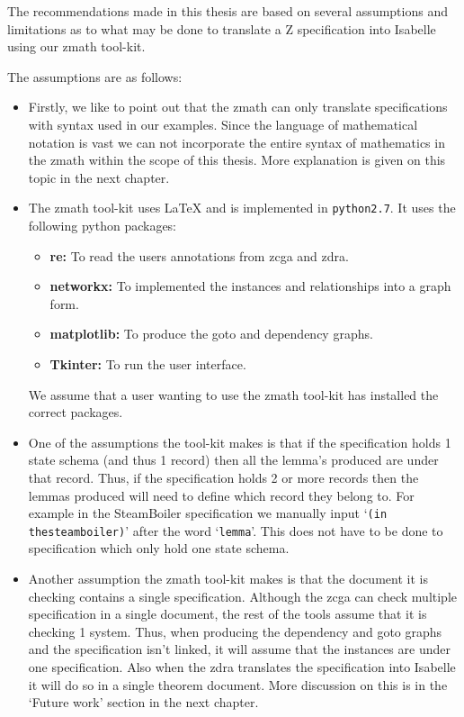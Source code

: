 The recommendations made in this thesis are based on several assumptions and
limitations as to what may be done to translate a Z specification into Isabelle
using our \gls{zmath} tool-kit.

The assumptions are as follows:

\begin{itemize}
\item Firstly, we like to point out that the \gls{zmath} can only translate
specifications with syntax used in our examples. Since the language of
mathematical notation is vast we can not incorporate the entire syntax of
mathematics in the \gls{zmath} within the scope of this thesis. More explanation
is given on this topic in the next chapter.

\item The \gls{zmath} tool-kit uses \LaTeX{} and is implemented in 
\verb|python2.7|. It uses the following python packages:
\begin{itemize}
\item \textbf{re:} To read the users annotations from \gls{zcga} and \gls{zdra}.
\item \textbf{networkx:} To implemented the instances and relationships into a
graph form.
\item \textbf{matplotlib:} To produce the goto and dependency graphs.
\item \textbf{Tkinter:} To run the user interface.
\end{itemize}

We assume that a user wanting to use the \gls{zmath} tool-kit has installed the
correct packages.

\item One of the assumptions the tool-kit makes is that if the specification
holds 1 state schema (and thus 1 record) then all the lemma's produced are under
that record. Thus, if the specification holds 2 or more records then the lemmas
produced will need to define which record they belong to. For example in the
SteamBoiler specification we manually input `\verb|(in thesteamboiler)|' after
the word `\verb|lemma|'. This does not have to be done to specification which
only hold one state schema.

\item Another assumption the \gls{zmath} tool-kit makes is that the document it is
checking contains a single specification. Although the \gls{zcga} can check
multiple specification in a single document, the rest of the tools assume that
it is checking 1 system. Thus, when producing the dependency and goto graphs and
the specification isn't linked, it will assume that the instances are under one
specification. Also when the \gls{zdra} translates the specification into
Isabelle it will do so in a single theorem document. More discussion on this is
in the `Future work' section in the next chapter.


\end{itemize}
